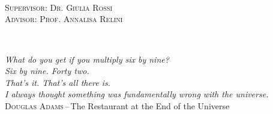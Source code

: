 \documentclass[a4paper,11pt,cleardoubleempty,abstracton]{scrbook}
\numberwithin{equation}{section}
\begin{document}
\pagestyle{empty}
\clearscrheadfoot
\frontmatter

%
\begin{titlepage}
\begin{center}
	~\\[3cm]
    \\\bigskip
     \\
\end{center}
\vfill
\noindent
\textsc{\sffamily Supervisor: Dr. Giulia Rossi}
~\\[0.5cm]
\textsc{\sffamily Advisor: Prof. Annalisa Relini}%
\end{titlepage}
\restoregeometry

\clearpage
~\\[3cm]
\begin{flushright}\footnotesize
	\textsl{What do you get if you multiply six by nine?}\\
	\textsl{Six by nine. Forty two.}\\
	\textsl{That's it. That's all there is.}\\
	\textsl{I always thought something was fundamentally wrong with the universe.}\\\medskip
	\textsc{\sffamily Douglas Adams}\,--\,\textsf{The Restaurant at the End of the Universe}
\end{flushright}
\vfill

%



\tableofcontents


\clearscrheadfoot
\pagestyle{scrheadings}
\end{document}
